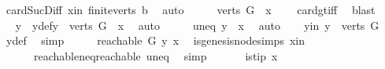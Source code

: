 \begin{isabellebody}
\ card{\isacharunderscore}{\kern0pt}Suc{\isacharunderscore}{\kern0pt}Diff{}\ x{\isacharunderscore}{\kern0pt}in\ finite{\isacharunderscore}{\kern0pt}verts\ b{}\ \isamarkupfalse%
\ auto\isanewline
\ \ \isamarkupfalse%
\ \isamarkupfalse%
\ {\isachardoublequoteopen}{\isacharparenleft}{\kern0pt}{\isacharparenleft}{\kern0pt}verts\ G{\isacharparenright}{\kern0pt}\ {\isacharminus}{\kern0pt}\ {\isacharbraceleft}{\kern0pt}x{\isacharbraceright}{\kern0pt}{\isacharparenright}{\kern0pt}\ {\isasymnoteq}\ {\isacharbraceleft}{\kern0pt}{\isacharbraceright}{\kern0pt}{\isachardoublequoteclose}\ \isamarkupfalse%
\ card{\isacharunderscore}{\kern0pt}gt{\isacharunderscore}{\kern0pt}{}{\isacharunderscore}{\kern0pt}iff\ \isamarkupfalse%
\ blast\isanewline
\ \ \isamarkupfalse%
\ \isamarkupfalse%
\ y\ \ y{\isacharunderscore}{\kern0pt}def{\isacharcolon}{\kern0pt}{\isachardoublequoteopen}y\ {\isasymin}\ {\isacharparenleft}{\kern0pt}verts\ G{\isacharparenright}{\kern0pt}\ {\isacharminus}{\kern0pt}\ {\isacharbraceleft}{\kern0pt}x{\isacharbraceright}{\kern0pt}{\isachardoublequoteclose}\ \isamarkupfalse%
\ auto\isanewline
\ \ \isamarkupfalse%
\ \isamarkupfalse%
\ uneq{\isacharcolon}{\kern0pt}\ {\isachardoublequoteopen}y\ {\isasymnoteq}\ x{\isachardoublequoteclose}\ \isamarkupfalse%
\ auto\isanewline
\ \ \isamarkupfalse%
\ y{\isacharunderscore}{\kern0pt}in{\isacharcolon}{\kern0pt}\ {\isachardoublequoteopen}y\ {\isasymin}\ {\isacharparenleft}{\kern0pt}verts\ G{\isacharparenright}{\kern0pt}{\isachardoublequoteclose}\ \isamarkupfalse%
\ y{\isacharunderscore}{\kern0pt}def\ \isamarkupfalse%
\ simp\isanewline
\ \ \isamarkupfalse%
\ \isamarkupfalse%
\ {\isachardoublequoteopen}reachable{}\ G\ y\ x{\isachardoublequoteclose}\ \isamarkupfalse%
\ is{\isacharunderscore}{\kern0pt}genesis{\isacharunderscore}{\kern0pt}node{\isachardot}{\kern0pt}simps\ x{\isacharunderscore}{\kern0pt}in\isanewline
\ \ \ \ \ \ reachable{\isacharunderscore}{\kern0pt}neq{\isacharunderscore}{\kern0pt}reachable{}\ uneq\ \isamarkupfalse%
\ simp\isanewline
\ \ \isamarkupfalse%
\ \isamarkupfalse%
\ {\isachardoublequoteopen}{\isasymnot}\ is{\isacharunderscore}{\kern0pt}tip\ x{\isachardoublequoteclose}\ \isamarkupfalse%

\end{isabellebody}
